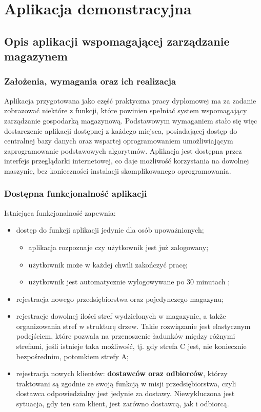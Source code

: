 \chapter{Aplikacja demonstracyjna}
\label{c6:c6}

\section{Opis aplikacji wspomagającej zarządzanie magazynem}
	\subsection{Założenia, wymagania oraz ich realizacja}
		Aplikacja przygotowana jako część praktyczna pracy dyplomowej ma za zadanie
		zobrazować niektóre z funkcji, które powinien spełniać system wspomagający
		zarządzanie gospodarką magazynową. Podstawowym wymaganiem stało się więc
		dostarczenie aplikacji dostępnej z każdego miejsca, posiadającej dostęp
		do centralnej bazy danych oraz wspartej oprogramowaniem umożliwiającym
		zaprogramowanie podstawowych algorytmów. Aplikacja jest dostępna przez interfejs przeglądarki
		internetowej, co daje możliwość korzystania na dowolnej maszynie, bez konieczności
		instalacji skomplikowanego oprogramowania. 
	\subsection{Dostępna funkcjonalność aplikacji}
		Istniejąca funkcjonalność zapewnia:
		\begin{itemize}
			\item dostęp do funkcji aplikacji jedynie dla osób upoważnionych;
			\begin{itemize}
				\item aplikacja rozpoznaje czy użytkownik jest już zalogowany;
				\item użytkownik może w każdej chwili zakończyć pracę;
				\item użytkownik jest automatycznie wylogowywane po 30 minutach ;
			\end{itemize}
			\item rejestracja nowego przedsiębiorstwa oraz pojedynczego magazynu;
			\item rejestracje dowolnej ilości stref wydzielonych w magazynie, a także organizowania
			stref w strukturę drzew. Takie rozwiązanie jest elastycznym podejściem, które
			pozwala na przenoszenie ładunków między różnymi strefami, jeśli istnieje taka możliwość, tj.
			gdy strefa C jest, nie koniecznie bezpośrednim, potomkiem strefy A;
			\item rejestracja nowych klientów: \textbf{dostawców oraz odbiorców}, którzy traktowani są
			zgodnie ze swoją funkcją w misji przedsiębiorstwa, czyli dostawca odpowiedzialny jest
			jedynie za dostawy. Niewykluczona jest sytuacja, gdy ten sam klient, jest zarówno dosta\-wcą, jak
			i odbiorcą. 
		\end{itemize}

